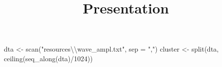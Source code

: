 \documentclass[
]{article}
\title{Presentation}
\author{}
\date{\vspace{-2.5em}}
\newenvironment{Shaded}{\begin{snugshade}}{\end{snugshade}}
\newcommand{\AttributeTok}[1]{\textcolor[rgb]{0.77,0.63,0.00}{#1}}
\newcommand{\DecValTok}[1]{\textcolor[rgb]{0.00,0.00,0.81}{#1}}
\newcommand{\FunctionTok}[1]{\textcolor[rgb]{0.00,0.00,0.00}{#1}}
\newcommand{\NormalTok}[1]{#1}
\newcommand{\OtherTok}[1]{\textcolor[rgb]{0.56,0.35,0.01}{#1}}
\newcommand{\SpecialCharTok}[1]{\textcolor[rgb]{0.00,0.00,0.00}{#1}}
\newcommand{\StringTok}[1]{\textcolor[rgb]{0.31,0.60,0.02}{#1}}
\begin{document}
\maketitle

\begin{Shaded}
\begin{Highlighting}[]
\NormalTok{dta }\OtherTok{\textless{}{-}} \FunctionTok{scan}\NormalTok{(}\StringTok{"resources}\SpecialCharTok{\textbackslash{}\textbackslash{}}\StringTok{wave\_ampl.txt"}\NormalTok{, }\AttributeTok{sep =} \StringTok{","}\NormalTok{)}
\NormalTok{cluster }\OtherTok{\textless{}{-}} \FunctionTok{split}\NormalTok{(dta, }\FunctionTok{ceiling}\NormalTok{(}\FunctionTok{seq\_along}\NormalTok{(dta)}\SpecialCharTok{/}\DecValTok{1024}\NormalTok{))}
\end{Highlighting}
\end{Shaded}
\end{document}
